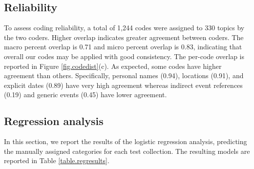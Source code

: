 \documentclass{sig-alternate}
\begin{document}

\subsection{Reliability}

To assess coding reliability, a total of 1,244 codes were assigned to 330 topics by the two coders. Higher overlap indicates greater agreement between coders. The macro percent overlap is 0.71 and  micro percent overlap is 0.83, indicating that overall our codes may be applied with good consistency. The per-code overlap is reported in Figure \ref{fig.codedist}(c). As expected, some codes have higher agreement than others. Specifically, personal names (0.94), locations (0.91), and explicit dates (0.89) have very high agreement whereas indirect event references (0.19) and generic events (0.45) have lower agreement.



\subsection{Regression analysis}

In this section, we report the results of the logistic regression analysis, predicting the manually assigned categories for each test collection. The resulting models are reported in Table \ref{table.regresults}. 
\end{document}
